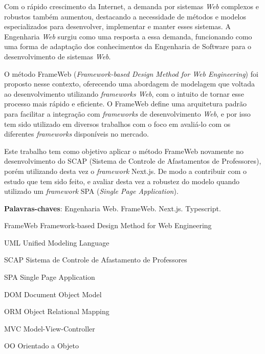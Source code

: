 \documentclass[
	12pt,				%
	openright,			%
	oneside,			%
	a4paper,			%
	english,			%
	french,				%
	spanish,			%
	brazil				%
	]{abntex2}
\begin{document}
\setlength{\absparsep}{18pt}
\begin{resumo}
  Com o rápido crescimento da Internet, a demanda por sistemas \textit{Web} complexos e robustos também
  aumentou, destacando a necessidade de métodos e modelos especializados para desenvolver, 
  implementar e manter esses sistemas. A Engenharia \textit{Web} surgiu como uma resposta a essa demanda,
  funcionando como uma forma de adaptação dos conhecimentos da Engenharia de Software para o
  desenvolvimento de sistemas \textit{Web}.

  O método FrameWeb (\textit{Framework-based Design Method for Web Engineering}) foi proposto nesse contexto,
  oferecendo uma abordagem de modelagem que voltada ao desenvolvimento utilizando \textit{frameworks Web}, com o intuito de tornar
  esse processo mais rápido e eficiente. O FrameWeb define uma arquitetura padrão para facilitar a
  integração com \textit{frameworks} de desenvolvimento \textit{Web}, e por isso tem sido utilizado em diversos trabalhos
  com o foco em avaliá-lo com os diferentes \textit{frameworks} disponíveis no mercado.

  Este trabalho tem como objetivo aplicar o método FrameWeb novamente no desenvolvimento do SCAP
  (Sistema de Controle de Afastamentos de Professores), porém utilizando desta vez o \textit{framework} Next.js. De modo a contribuir com o estudo que tem sido feito,
  e avaliar desta vez a robustez do modelo quando utilizado um \textit{framework} SPA (\textit{Single Page Application}).

\textbf{Palavras-chaves}: Engenharia Web. FrameWeb. Next.js. Typescript.
\end{resumo}

\listoffigures*
\cleardoublepage

\listoftables*
\cleardoublepage

\begin{siglas}
	\item[FrameWeb] Framework-based Design Method for Web Engineering
  \item[UML] Unified Modeling Language
  \item[SCAP] Sistema de Controle de Afastamento de Professores
  \item[SPA] Single Page Application 
  \item[DOM] Document Object Model
  \item[ORM] Object Relational Mapping
  \item[MVC] Model-View-Controller
  \item[OO] Orientado a Objeto  
\end{siglas}
\end{document}
